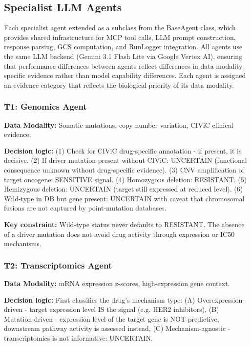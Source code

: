 \documentclass{article}
\begin{document}
\subsection{Specialist LLM Agents}
Each specialist agent extended as a subclass from the BaseAgent class, which provides shared infrastructure for MCP tool calls, LLM prompt construction, response parsing, GCS computation, and RunLogger integration. All agents use the same LLM backend (Gemini 3.1 Flash Lite via Google Vertex AI), ensuring that performance differences between agents reflect differences in data modality-specific evidence rather than model capability differences. Each agent is assigned an evidence category that reflects the biological priority of its data modality.

\subsubsection{T1: Genomics Agent}
\textbf{Data Modality:} Somatic mutations, copy number variation, CIViC clinical evidence.

\noindent\textbf{Decision logic:} (1) Check for CIViC drug-specific annotation - if present, it is decisive. (2) If driver mutation present without CIViC: UNCERTAIN (functional consequence unknown without drug-specific evidence). (3) CNV amplification of target oncogene: SENSITIVE signal. (4) Homozygous deletion: RESISTANT. (5) Hemizygous deletion: UNCERTAIN (target still expressed at reduced level). (6) Wild-type in DB but gene present: UNCERTAIN with caveat that chromosomal fusions are not captured by point-mutation databases.

\noindent\textbf{Key constraint:} Wild-type status never defaults to RESISTANT. The absence of a driver mutation does not avoid drug activity through expression or IC50 mechanisms.

\subsubsection{T2: Transcriptomics Agent}
\textbf{Data Modality:} mRNA expression z-scores, high-expression gene context.

\noindent\textbf{Decision logic:} First classifies the drug's mechanism type: (A) Overexpression-driven - target expression level IS the signal (e.g. HER2 inhibitors), (B) Mutation-driven - expression level of the target gene is NOT predictive, downstream pathway activity is assessed instead, (C) Mechanism-agnostic - transcriptomics is not informative: UNCERTAIN.
\end{document}
